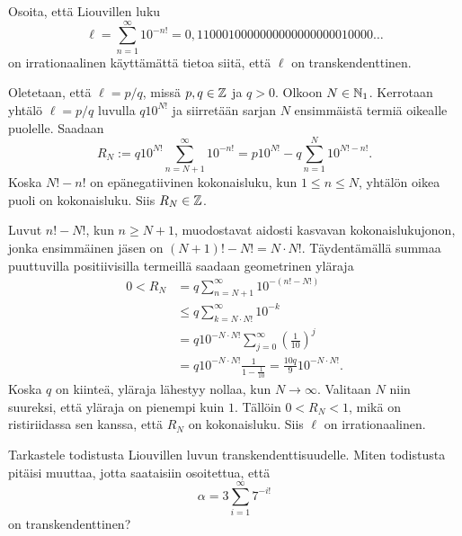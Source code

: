\documentclass[11pt,a4paper]{amsart}
\begin{document}
\begin{exercise}
Osoita, että Liouvillen luku
\[
  \ell = \sum_{n=1}^{\infty} 10^{-n!}
  = 0{,}1100010000000000000000010000\ldots
\]
on irrationaalinen käyttämättä tietoa siitä, että \(\ell\) on
transkendenttinen.
\end{exercise}

\begin{solution}
Oletetaan, että \(\ell = p/q\), missä \(p,q\in\mathbb{Z}\) ja \(q>0\).
Olkoon \(N\in\mathbb{N}_1\). Kerrotaan yhtälö \(\ell=p/q\) luvulla \(q10^{N!}\)
ja siirretään sarjan \(N\) ensimmäistä termiä oikealle puolelle. Saadaan
\[
  R_N := q10^{N!}\sum_{n=N+1}^{\infty} 10^{-n!}
  = p10^{N!} - q\sum_{n=1}^{N} 10^{N!-n!}.
\]
Koska \(N!-n!\) on epänegatiivinen kokonaisluku, kun \(1\le n\le N\),
yhtälön oikea puoli on kokonaisluku. Siis \(R_N\in\mathbb{Z}\).

Luvut \(n!-N!\), kun \(n\ge N+1\), muodostavat aidosti kasvavan
kokonaislukujonon, jonka ensimmäinen jäsen on \((N+1)!-N!=N\cdot N!\).
Täydentämällä summaa puuttuvilla positiivisilla termeillä saadaan
geometrinen yläraja
\[
  \begin{aligned}
    0 < R_N &= q\sum_{n=N+1}^{\infty} 10^{-(n!-N!)} \\
    &\le q\sum_{k=N\cdot N!}^{\infty} 10^{-k} \\
    &= q10^{-N\cdot N!}\sum_{j=0}^{\infty} \left(\frac{1}{10}\right)^j \\
    &= q10^{-N\cdot N!}\frac{1}{1-\frac{1}{10}}
    = \frac{10q}{9}10^{-N\cdot N!}.
  \end{aligned}
\]
Koska \(q\) on kiinteä, yläraja lähestyy nollaa, kun \(N\to\infty\).
Valitaan \(N\) niin suureksi, että yläraja on pienempi kuin \(1\).
Tällöin \(0<R_N<1\), mikä on ristiriidassa sen kanssa, että \(R_N\)
on kokonaisluku. Siis \(\ell\) on irrationaalinen.
\end{solution}

\begin{exercise}
Tarkastele todistusta Liouvillen luvun transkendenttisuudelle.
Miten todistusta pitäisi muuttaa, jotta saataisiin osoitettua, että
\[
  \alpha = 3\sum_{i=1}^{\infty} 7^{-i!}
\]
on transkendenttinen?
\end{exercise}
\end{document}
